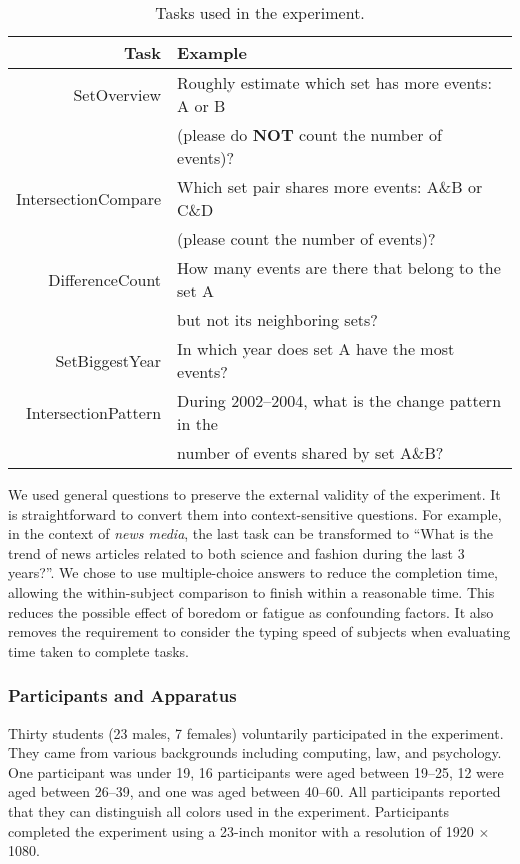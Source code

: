 \begin{table}[ht]
\centering
\sffamily\small
\caption{Tasks used in the experiment.}
\label{table:tasks}
\begin{tabular}{rl}
	\toprule
	\textbf{Task} & \textbf{Example} \\ 
	\midrule
	SetOverview & Roughly estimate which set has more events:  A or B \\&(please do \textbf{NOT} count the number of events)? \\		
 	IntersectionCompare & Which set pair shares more events: A\&B or C\&D\\&  (please count the number of events)? \\ 
 	DifferenceCount & How many events are there that belong to the set A \\&but not its neighboring sets? \\ 
 	SetBiggestYear & In which year does set A have the most events? \\ 
 	IntersectionPattern & During 2002--2004, what is the change pattern in the \\& number of  events shared by set A\&B?\\
	\bottomrule
\end{tabular} 
\end{table}


We used general questions to preserve the external validity of the experiment. It is straightforward to convert them into context-sensitive questions. For example, in the context of \textit{news media}, the last task can be transformed to ``What is the trend of news articles related to both science and fashion during the last 3 years?''. We chose to use multiple-choice answers to reduce the completion time, allowing the within-subject comparison to finish within a reasonable time. This reduces the possible effect of boredom or fatigue as confounding factors. It also removes the requirement to consider the typing speed of subjects when evaluating time taken to complete tasks.

\subsubsection{Participants and Apparatus} Thirty students (23 males, 7 females) voluntarily participated in the experiment. They came from various backgrounds including computing, law, and psychology. One participant was under 19, 16 participants were aged between 19--25, 12 were aged between 26--39, and one was aged between 40--60. All participants reported that they can distinguish all colors used in the experiment. Participants completed the experiment using a 23-inch monitor with a resolution of 1920 $\times$ 1080.

